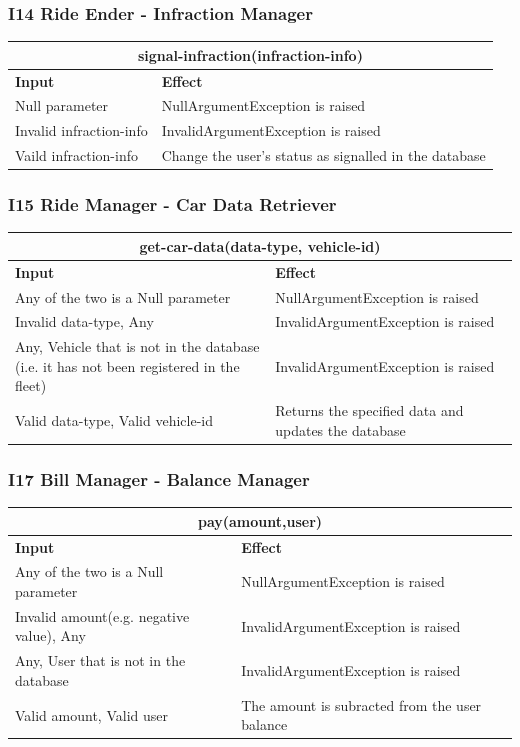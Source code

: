 \documentclass{article}
\begin{document}
\subsubsection{I14 Ride Ender - Infraction Manager}
\begin{tabular}{ |p{5cm}|p{7cm}| }
  \hline
  \multicolumn{2}{|c|}{signal-infraction(infraction-info)} \\
  \hline
  \textbf{Input} & \textbf{Effect} \\
  \hline
  Null parameter & NullArgumentException is raised\\
  \hline
  Invalid infraction-info & InvalidArgumentException is raised \\
  \hline
  Vaild infraction-info & Change the user's status as signalled in the database\\
  \hline
\end{tabular}
\subsubsection{I15 Ride Manager - Car Data Retriever }
\begin{tabular}{ |p{5cm}|p{7cm}| }
  \hline
  \multicolumn{2}{|c|}{get-car-data(data-type, vehicle-id)} \\
  \hline
  \textbf{Input} & \textbf{Effect} \\
  \hline
  Any of the two is a Null parameter & NullArgumentException is raised\\
  \hline
  Invalid data-type, Any & InvalidArgumentException is raised\\
  \hline
  Any, Vehicle that is not in the database (i.e. it has not been registered in the fleet) & InvalidArgumentException is raised\\
  \hline
   Valid data-type, Valid vehicle-id & Returns the specified data and updates the database\\
  \hline
\end{tabular}
\subsubsection{I17 Bill Manager - Balance Manager }
\begin{tabular}{ |p{5cm}|p{7cm}| }
  \hline
  \multicolumn{2}{|c|}{pay(amount,user)} \\
  \hline
  \textbf{Input} & \textbf{Effect} \\
  \hline
  Any of the two is a Null parameter & NullArgumentException is raised\\
  \hline
  Invalid amount(e.g. negative value), Any & InvalidArgumentException is raised\\
  \hline
  Any, User that is not in the database & InvalidArgumentException is raised\\
  \hline
   Valid amount, Valid user & The amount is subracted from the user balance\\
  \hline
\end{tabular}
\end{document}
